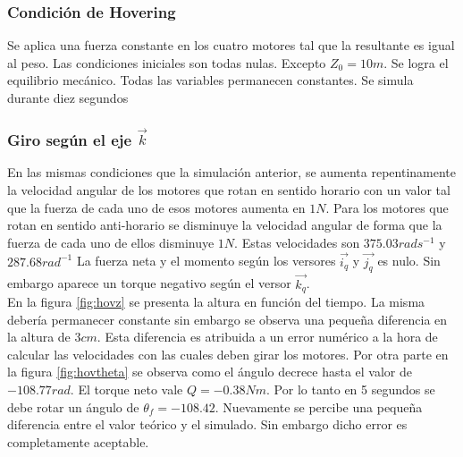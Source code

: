 \documentclass[main]{subfiles}
\begin{document}
\subsubsection{Condici\'on de Hovering}

Se aplica una fuerza constante en los cuatro motores tal que la resultante es igual al peso. Las condiciones iniciales son todas nulas. Excepto $Z_0=10m$. Se logra el equilibrio mec\'anico. Todas las variables permanecen constantes. Se simula durante diez segundos

\subsubsection{Giro seg\'un el eje $\vec{k}$}

En las mismas condiciones que la simulaci\'on anterior, se aumenta repentinamente la velocidad angular de los motores que rotan en sentido horario con un valor tal que la fuerza de cada uno de esos motores aumenta en $1N$. Para los motores que rotan en sentido anti-horario se disminuye la velocidad angular de forma que la fuerza de cada uno de ellos disminuye $1N$. Estas velocidades son $375.03rads^{-1}$ y $287.68rad^{-1}$ La fuerza neta y el momento seg\'un los versores $\vec{i_q}$ y $\vec{j_q} $ es nulo. Sin embargo aparece un torque negativo seg\'un el versor $\vec{k_q}$.\\

En la figura \ref{fig:hovz} se presenta la altura en funci\'on del tiempo. La misma deber\'ia permanecer constante sin embargo se observa una peque\~na diferencia en la altura de $3cm$. Esta diferencia es atribuida a un error num\'erico a la hora de calcular las velocidades con las cuales deben girar los motores. Por otra parte en la figura \ref{fig:hovtheta} se observa como el \'angulo decrece hasta el valor de $-108.77 rad$. El torque neto vale $Q = -0.38Nm $. Por lo tanto en 5 segundos se debe rotar un \'angulo de $\theta_f=-108.42$. Nuevamente se percibe una peque\~na diferencia entre el valor te\'orico y el simulado. Sin embargo dicho error es completamente aceptable. 
\end{document}
